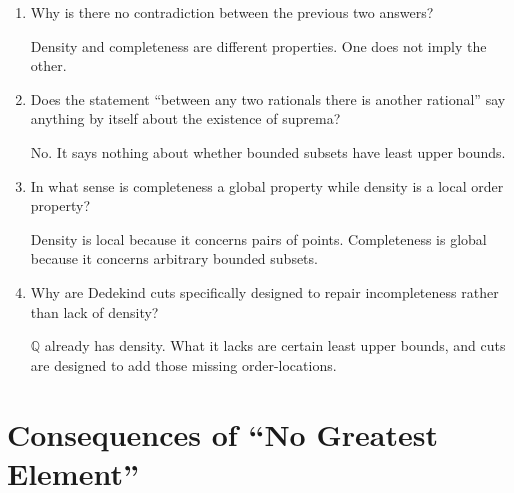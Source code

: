 \documentclass{self-check}
\begin{document}
\begin{enumerate}[label=\arabic{*}., itemsep=10pt]
    \begin{answer}
      No.
    \end{answer}
  \item Why is there no contradiction between the previous two answers?

    \begin{answer}
      Density and completeness are different properties. One does not imply the other.
    \end{answer}
  \item Does the statement ``between any two rationals there is another rational'' say anything by itself about the existence of suprema?

    \begin{answer}
      No. It says nothing about whether bounded subsets have least upper bounds.
    \end{answer}
  \item In what sense is completeness a global property while density is a local order property?

    \begin{answer}
      Density is local because it concerns pairs of points. Completeness is global because it concerns arbitrary bounded subsets.
    \end{answer}
  \item Why are Dedekind cuts specifically designed to repair incompleteness rather than lack of density?

    \begin{answer}
      \(\mathbb{Q}\) already has density. What it lacks are certain least upper bounds, and cuts are designed to add those missing order-locations.
    \end{answer}
\end{enumerate}

\section{Consequences of ``No Greatest Element''}
\end{document}
